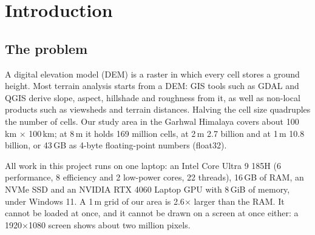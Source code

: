 \documentclass[11pt,a4paper]{article}
\begin{document}
\section{Introduction}
\subsection{The problem}
A digital elevation model (DEM) is a raster in which every cell stores a ground height. Most terrain analysis starts
from a DEM: GIS tools such as GDAL and QGIS derive slope, aspect, hillshade and roughness from it, as well as
non-local products such as viewsheds and terrain distances. Halving the cell size quadruples the number of cells.
Our study area in the Garhwal Himalaya covers about 100\,km $\times$ 100\,km; at 8\,m it holds 169 million cells,
at 2\,m 2.7 billion and at 1\,m 10.8 billion, or 43\,GB as 4-byte floating-point numbers (float32).

All work in this project runs on one laptop: an Intel Core Ultra 9 185H (6 performance, 8 efficiency and 2 low-power
cores, 22 threads), 16\,GB of RAM, an NVMe SSD and an NVIDIA RTX 4060 Laptop GPU with 8\,GiB of memory, under
Windows 11. A 1\,m grid of our area is 2.6$\times$ larger than the RAM. It cannot be loaded at once, and it cannot be
drawn on a screen at once either: a 1920$\times$1080 screen shows about two million pixels.
\end{document}
